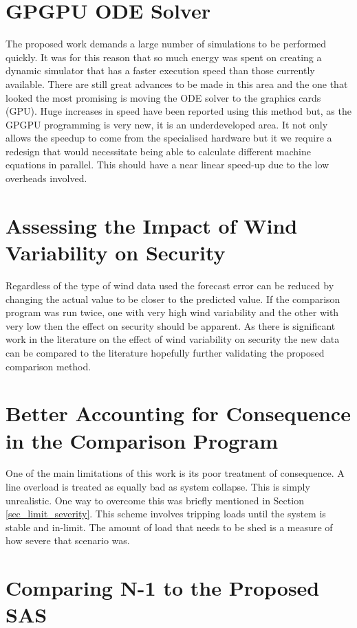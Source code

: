 \documentclass[a4paper,oneside,12pt]{report}
\begin{document}
\section{GPGPU ODE Solver}

The proposed work demands a large number of simulations to be performed quickly. It was for this reason that so much energy was spent on creating a dynamic simulator that has a faster execution speed than those currently available. There are still great advances to be made in this area and the one that looked the most promising is moving the ODE solver to the graphics cards (GPU). Huge increases in speed have been reported using this method but, as the GPGPU programming is very new, it is an underdeveloped area. It not only allows the speedup to come from the specialised hardware but it we require a redesign that would necessitate being able to calculate different machine equations in parallel. This should have a near linear speed-up due to the low overheads involved.

\section{Assessing the Impact of Wind Variability on Security}

Regardless of the type of wind data used the forecast error can be reduced by changing the actual value to be closer to the predicted value. If the comparison program was run twice, one with very high wind variability and the other with very low then the effect on security should be apparent. As there is significant work in the literature on the effect of wind variability on security the new data can be compared to the literature hopefully further validating the proposed comparison method.

\section{Better Accounting for Consequence in the Comparison Program}

One of the main limitations of this work is its poor treatment of consequence. A line overload is treated as equally bad as system collapse. This is simply unrealistic. One way to overcome this was briefly mentioned in Section \ref{sec_limit_severity}. This scheme involves tripping loads until the system is stable and in-limit. The amount of load that needs to be shed is a measure of how severe that scenario was.

\section{Comparing N-1 to the Proposed SAS}
\end{document}
